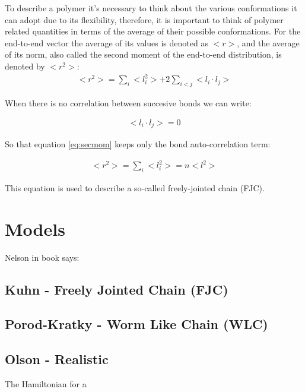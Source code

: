 To  describe a  polymer  it's  necessary to  think  about the  various
conformations it can adopt  due to its flexibility, therefore, it
is important  to think of polymer  related quantities in  terms of the
average of their possible conformations. For the end-to-end vector the
average of  its values  is denoted  as $<r>$, and  the average  of its
norm, also called the second moment of the end-to-end distribution, is
denoted by $<r^2>$:
\begin{gather}
\label{eq:secmom}  
<r^2>=\sum_{i}<l_{i}^2> + 2\sum_{i<j}<l_{i} \cdot l_{j}>
\end{gather}  

When there is no correlation between succesive bonds we can write:

\begin{gather}
\label{eq:nocorr}
<l_{i} \cdot l_{j}> = 0
\end{gather}

So that equation \ref{eq:secmom} keeps only the bond auto-correlation term:

\begin{gather}
<r^2> = \sum_{i}<l_{i}^2> = n<l^2>
\end{gather}  

This equation is used to describe a so-called freely-jointed chain (FJC).

\section{Models}

Nelson in book says:



\subsection{Kuhn - Freely Jointed Chain (FJC)}

\subsection{Porod-Kratky - Worm Like Chain (WLC)}

\subsection{Olson - Realistic}

The Hamiltonian for a \cite{czapla2009}






